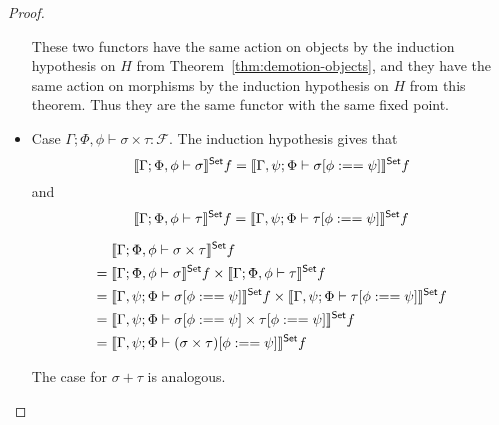 \documentclass[acmsmall,review,anonymous]{acmart}
\theoremstyle{definition}
\newcommand{\F}{\mathcal{F}}
\begin{document}
\begin{proof}
\begin{itemize}
      These two functors have the same action on objects by the induction hypothesis on $H$ from Theorem~\ref{thm:demotion-objects},
      and they have the same action on morphisms by the induction hypothesis on $H$ from this theorem. 
      Thus they are the same functor with the same fixed point.

  \item Case $\Gamma; \Phi, \phi \vdash \sigma \times \tau : \F$. The induction hypothesis gives that 
      $$\llbracket{\Gamma; \Phi, \phi \vdash \sigma }\rrbracket^{\mathsf{Set}} f
        = \llbracket{\Gamma, \psi; \Phi \vdash \sigma[\phi :== \psi] }\rrbracket^{\mathsf{Set}} f$$ 
        and
      $$\llbracket{\Gamma; \Phi, \phi \vdash \tau }\rrbracket^{\mathsf{Set}} f
        = \llbracket{\Gamma, \psi; \Phi \vdash \tau[\phi :== \psi] }\rrbracket^{\mathsf{Set}} f$$ 

    \begin{align*}
           & \llbracket{\Gamma; \Phi, \phi \vdash \sigma \times \tau}\rrbracket^{\mathsf{Set}} f \\
      = \; & \llbracket{\Gamma; \Phi, \phi \vdash \sigma}\rrbracket^{\mathsf{Set}} f \times \llbracket{\Gamma; \Phi, \phi \vdash \tau}\rrbracket^{\mathsf{Set}} f \\
      = \; & \llbracket{\Gamma, \psi; \Phi \vdash \sigma[\phi :== \psi]}\rrbracket^{\mathsf{Set}} f \times \llbracket{\Gamma, \psi; \Phi \vdash \tau[\phi :== \psi]}\rrbracket^{\mathsf{Set}} f \\
      = \; & \llbracket{\Gamma, \psi; \Phi \vdash \sigma[\phi :==\psi] \times \tau[\phi :== \psi]}\rrbracket^{\mathsf{Set}} f \\
      = \; & \llbracket{\Gamma, \psi; \Phi \vdash (\sigma \times \tau)[\phi :== \psi]}\rrbracket^{\mathsf{Set}} f
    \end{align*}


    The case for $\sigma + \tau$ is analogous.
\end{itemize}
\end{proof}
\end{document}
